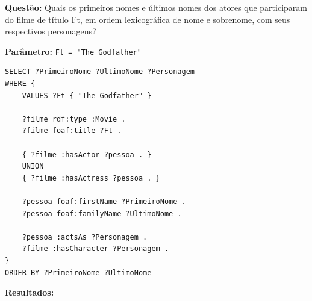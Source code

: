 \documentclass[12pt,a4paper]{article}
\begin{document}
\textbf{Questão:} Quais os primeiros nomes e últimos nomes dos atores que participaram do filme de título Ft, em ordem lexicográfica de nome e sobrenome, com seus respectivos personagens?

\textbf{Parâmetro:} \texttt{Ft = "The Godfather"}

\begin{lstlisting}
SELECT ?PrimeiroNome ?UltimoNome ?Personagem
WHERE {
    VALUES ?Ft { "The Godfather" }
    
    ?filme rdf:type :Movie .
    ?filme foaf:title ?Ft .
    
    { ?filme :hasActor ?pessoa . }
    UNION
    { ?filme :hasActress ?pessoa . }
    
    ?pessoa foaf:firstName ?PrimeiroNome .
    ?pessoa foaf:familyName ?UltimoNome .
    
    ?pessoa :actsAs ?Personagem .
    ?filme :hasCharacter ?Personagem .
}
ORDER BY ?PrimeiroNome ?UltimoNome
\end{lstlisting}

\textbf{Resultados:}
\end{document}
